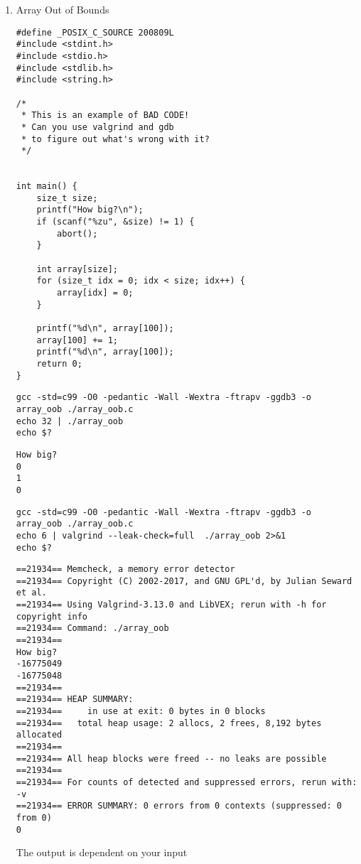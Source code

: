 \documentclass[11pt]{article}
\begin{document}
\begin{enumerate}
\item Array Out of Bounds
\label{sec:org17b1dc2}

\begin{verbatim}
#define _POSIX_C_SOURCE 200809L
#include <stdint.h>
#include <stdio.h>
#include <stdlib.h>
#include <string.h>

/*
 * This is an example of BAD CODE!
 * Can you use valgrind and gdb 
 * to figure out what's wrong with it?
 */


int main() {
    size_t size;
    printf("How big?\n");
    if (scanf("%zu", &size) != 1) {
        abort();
    }

    int array[size];
    for (size_t idx = 0; idx < size; idx++) {
        array[idx] = 0;
    }
    
    printf("%d\n", array[100]);
    array[100] += 1;
    printf("%d\n", array[100]);
    return 0;
}
\end{verbatim}

\begin{verbatim}
gcc -std=c99 -O0 -pedantic -Wall -Wextra -ftrapv -ggdb3 -o array_oob ./array_oob.c
echo 32 | ./array_oob 
echo $?
\end{verbatim}

\begin{verbatim}
How big?
0
1
0
\end{verbatim}


\begin{verbatim}
gcc -std=c99 -O0 -pedantic -Wall -Wextra -ftrapv -ggdb3 -o array_oob ./array_oob.c
echo 6 | valgrind --leak-check=full  ./array_oob 2>&1
echo $?
\end{verbatim}

\begin{verbatim}
==21934== Memcheck, a memory error detector
==21934== Copyright (C) 2002-2017, and GNU GPL'd, by Julian Seward et al.
==21934== Using Valgrind-3.13.0 and LibVEX; rerun with -h for copyright info
==21934== Command: ./array_oob
==21934== 
How big?
-16775049
-16775048
==21934== 
==21934== HEAP SUMMARY:
==21934==     in use at exit: 0 bytes in 0 blocks
==21934==   total heap usage: 2 allocs, 2 frees, 8,192 bytes allocated
==21934== 
==21934== All heap blocks were freed -- no leaks are possible
==21934== 
==21934== For counts of detected and suppressed errors, rerun with: -v
==21934== ERROR SUMMARY: 0 errors from 0 contexts (suppressed: 0 from 0)
0
\end{verbatim}

The output is dependent on your input


\end{enumerate}
\end{document}
